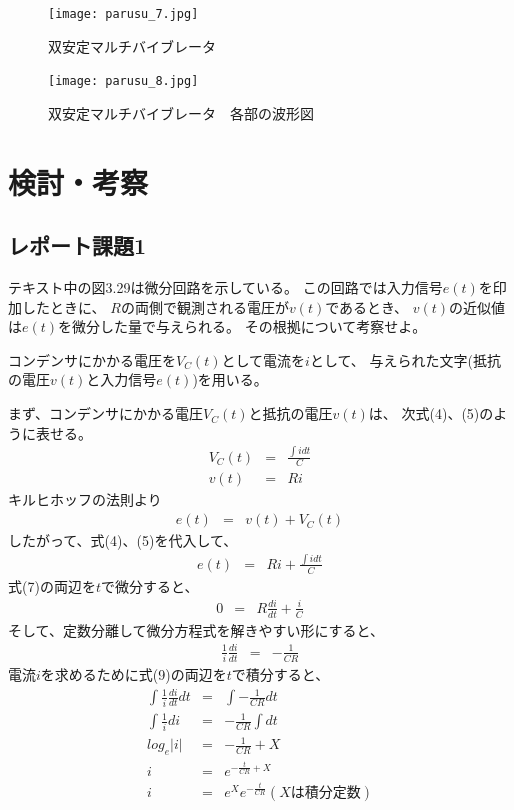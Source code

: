 \documentclass[12pt]{jarticle}
\begin{document}
\clearpage
\begin{figure}[h]
    \begin{center}
        \texttt{[image: parusu\_7.jpg]}
    \end{center}
    \caption{双安定マルチバイブレータ}
    \label{fig7}
    \begin{center}
        \texttt{[image: parusu\_8.jpg]}
    \end{center}
    \caption{双安定マルチバイブレータ　各部の波形図}
    \label{fig8}
\end{figure}
\clearpage

\section{検討・考察}

\subsection{レポート課題1}
\begin{shadebox}
    テキスト中の図3.29は微分回路を示している。
    この回路では入力信号$e(t)$を印加したときに、
    $R$の両側で観測される電圧が$v(t)$であるとき、
    $v(t)$の近似値は$e(t)$を微分した量で与えられる。
    その根拠について考察せよ。
\end{shadebox}
コンデンサにかかる電圧を$V_C(t)$として電流を$i$として、
与えられた文字(抵抗の電圧$v(t)$と入力信号$e(t)$)を用いる。

まず、コンデンサにかかる電圧$V_C(t)$と抵抗の電圧$v(t)$は、
次式(4)、(5)のように表せる。
\begin{eqnarray}
    V_C(t)&=&\frac{\int idt}{C}\\
    v(t)&=&Ri
\end{eqnarray}
キルヒホッフの法則より
\begin{eqnarray}
    e(t)&=&v(t)+V_C(t)
\end{eqnarray}
したがって、式(4)、(5)を代入して、
\begin{eqnarray}
    e(t)&=&Ri+\frac{\int idt}{C}
\end{eqnarray}
式(7)の両辺を$t$で微分すると、
\begin{eqnarray}
    0&=&R\frac{di}{dt}+\frac{i}{C}
\end{eqnarray}
そして、定数分離して微分方程式を解きやすい形にすると、
\begin{eqnarray}
    \frac{1}{i}\frac{di}{dt}&=&-\frac{1}{CR}
\end{eqnarray}
電流$i$を求めるために式(9)の両辺を$t$で積分すると、
\begin{eqnarray}
    \int \frac{1}{i} \frac{di}{dt}dt&=&\int-\frac{1}{CR}dt \nonumber\\
    \int \frac{1}{i}di&=&-\frac{1}{CR}\int dt \nonumber\\
    log_e|i|&=&-\frac{1}{CR}+X \nonumber\\
    i&=&e^{-\frac{t}{CR}+X} \nonumber\\
    i&=&e^Xe^{-\frac{t}{CR}}(Xは積分定数)
\end{eqnarray}
\clearpage
\end{document}

